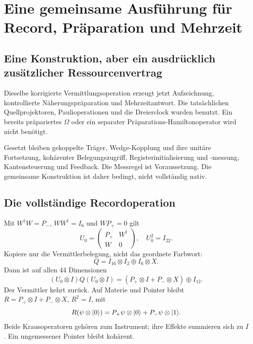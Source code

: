 \chapter{Eine gemeinsame Ausführung für Record, Präparation und Mehrzeit}
\label{ch:execution13}
\section{Eine Konstruktion, aber ein ausdrücklich zusätzlicher Ressourcenvertrag}
Dieselbe korrigierte Vermittlungsoperation erzeugt jetzt Aufzeichnung, kontrollierte Näherungspräparation und Mehrzeitantwort. Die tatsächlichen Quellprojektoren, Paulioperationen und die Dreierclock wurden benutzt. Ein bereits präpariertes $\Omega$ oder ein separater Präparations-Hamiltonoperator wird nicht benötigt.

Gesetzt bleiben gekoppelte Träger, Wedge-Kopplung und ihre unitäre Fortsetzung, kohärenter Belegungszugriff, Registerinitialisierung und -messung, Kantensteuerung und Feedback. Die Messregel ist Voraussetzung. Die gemeinsame Konstruktion ist daher bedingt, nicht vollständig nativ.

\section{Die vollständige Recordoperation}
Mit $W^\dagger W=P_-$, $WW^\dagger=I_6$ und $WP_+=0$ gilt
\begin{equation}
U_0=\begin{pmatrix}P_+&W^\dagger\\W&0\end{pmatrix},\quad U_0^2=I_{22}.
\end{equation}
Kopiere nur die Vermittlerbelegung, nicht das geordnete Farbwort:
\begin{equation}
Q=I_{16}\otimes I_2\oplus I_6\otimes X.
\end{equation}
Dann ist auf allen 44 Dimensionen
\begin{equation}
(U_0\otimes I)Q(U_0\otimes I)
=(P_+\otimes I+P_-\otimes X)\oplus I_{12}.
\end{equation}
Der Vermittler kehrt zurück. Auf Materie und Pointer bleibt $R=P_+\otimes I+P_-\otimes X$, $R^2=I$, mit
\begin{equation}
R(\psi\otimes\lvert0\rangle)=P_+\psi\otimes\lvert0\rangle+P_-\psi\otimes\lvert1\rangle.
\end{equation}
Beide Krausoperatoren gehören zum Instrument; ihre Effekte summieren sich zu $I$. Ein ungemessener Pointer bleibt kohärent.

